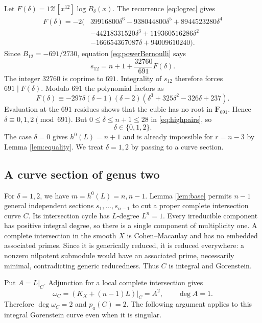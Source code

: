 \documentclass[11pt,reqno,letterpaper]{amsart}
\theoremstyle{definition}
\numberwithin{equation}{section}
\begin{document}
Let $F(\delta)=12![x^{12}]\log B_\delta(x)$.
The recurrence \eqref{eq:logrec} gives
\begin{align*}
F(\delta)=-2\bigl(&39916800\delta^6-938044800\delta^5
                     +8944523280\delta^4\\
 &-44218331520\delta^3+119360516286\delta^2\\
 &-166654367087\delta+94009610240\bigr).
\end{align*}
Since $B_{12}=-691/2730$, equation \eqref{eq:powerBernoulli} says
\[
 s_{12}=n+1+\frac{32760}{691}F(\delta).
\]
The integer $32760$ is coprime to $691$. Integrality of $s_{12}$
therefore forces $691\mid F(\delta)$.
Modulo $691$ the polynomial factors as
\[
 F(\delta)\equiv
 -297\delta(\delta-1)(\delta-2)
 (\delta^3+325\delta^2-326\delta+237).
\]
Evaluation at the $691$ residues shows that the cubic has no root
in $\mathbf F_{691}$. Hence
$\delta\equiv0,1,2\pmod{691}$.
But $0\le\delta\le n+1\le28$ in \eqref{eq:highpairs}, so
\begin{equation}\label{eq:deltasmall}
 \delta\in\{0,1,2\}.
\end{equation}
The case $\delta=0$ gives $h^0(L)=n+1$ and is already impossible for
$r=n-3$ by Lemma \ref{lem:equality}. We treat $\delta=1,2$ by passing to a curve section.

\subsection{A curve section of genus two}
For $\delta=1,2$, we have $m=h^0(L)=n,n-1$.
Lemma \ref{lem:base} permits $n-1$ general independent sections
$s_1,\ldots,s_{n-1}$ to cut a proper complete intersection curve $C$.
Its intersection cycle has $L$-degree $L^n=1$.
Every irreducible component has positive integral degree, so there is a
single component of multiplicity one. A complete intersection in the
smooth $X$ is Cohen--Macaulay and has no embedded associated primes.
Since it is generically reduced, it is reduced everywhere: a nonzero
nilpotent submodule would have an associated prime, necessarily minimal,
contradicting generic reducedness. Thus $C$ is integral and Gorenstein.

Put $A=L|_C$. Adjunction for a local complete intersection gives
\[
 \omega_C=(K_X+(n-1)L)|_C=A^2,\qquad \deg A=1.
\]
Therefore $\deg\omega_C=2$ and $p_a(C)=2$.
The following argument applies to this integral Gorenstein curve even
when it is singular.
\end{document}
